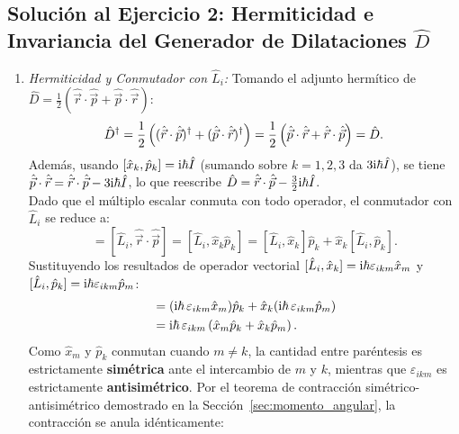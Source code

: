 \begin{appendices}
\subsection[Solución 2: Generador de dilataciones $\hat{D}$]{Solución al Ejercicio 2: Hermiticidad e Invariancia del Generador de Dilataciones $\hat{D}$}
\begin{enumerate}
    \item \textit{Hermiticidad y Conmutador con $\hat{L}_i$:} Tomando el adjunto hermítico de $\hat{D} = \frac{1}{2}(\hat{\vec{r}}\cdot\hat{\vec{p}} + \hat{\vec{p}}\cdot\hat{\vec{r}})$:
    \begin{equation}
        \hat{D}^\dagger = \frac{1}{2}\left( (\hat{\vec{r}}\cdot\hat{\vec{p}})^\dagger + (\hat{\vec{p}}\cdot\hat{\vec{r}})^\dagger \right) = \frac{1}{2}\left( \hat{\vec{p}}\cdot\hat{\vec{r}} + \hat{\vec{r}}\cdot\hat{\vec{p}} \right) = \hat{D}.
    \end{equation}
    Además, usando $[\hat{x}_k, \hat{p}_k] = \mathrm{i}\hbar\hat{I}$ (sumando sobre $k=1,2,3$ da $3\mathrm{i}\hbar\hat{I}$), se tiene $\hat{\vec{p}}\cdot\hat{\vec{r}} = \hat{\vec{r}}\cdot\hat{\vec{p}} - 3\mathrm{i}\hbar\hat{I}$, lo que reescribe $\hat{D} = \hat{\vec{r}}\cdot\hat{\vec{p}} - \frac{3}{2}\mathrm{i}\hbar\hat{I}$.\\
    Dado que el múltiplo escalar conmuta con todo operador, el conmutador con $\hat{L}_i$ se reduce a:
    \begin{equation}
        [\hat{L}_i, \hat{D}] = [\hat{L}_i, \hat{\vec{r}}\cdot\hat{\vec{p}}] = [\hat{L}_i, \hat{x}_k\hat{p}_k] = [\hat{L}_i, \hat{x}_k]\hat{p}_k + \hat{x}_k[\hat{L}_i, \hat{p}_k].
    \end{equation}
    Sustituyendo los resultados de operador vectorial $[\hat{L}_i, \hat{x}_k] = \mathrm{i}\hbar\varepsilon_{ikm}\hat{x}_m$ y $[\hat{L}_i, \hat{p}_k] = \mathrm{i}\hbar\varepsilon_{ikm}\hat{p}_m$:
    \begin{align}
        [\hat{L}_i, \hat{D}] &= (\iu\hbar\,\varepsilon_{ikm}\hat{x}_m)\hat{p}_k + \hat{x}_k(\iu\hbar\,\varepsilon_{ikm}\hat{p}_m) \nonumber\\
        &= \iu\hbar\,\varepsilon_{ikm}\left( \hat{x}_m\hat{p}_k + \hat{x}_k\hat{p}_m \right).
    \end{align}
    Como $\hat{x}_m$ y $\hat{p}_k$ conmutan cuando $m \neq k$, la cantidad entre paréntesis es estrictamente \textbf{simétrica} ante el intercambio de $m$ y $k$, mientras que $\varepsilon_{ikm}$ es estrictamente \textbf{antisimétrico}. Por el teorema de contracción simétrico-antisimétrico demostrado en la Sección~\ref{sec:momento_angular}, la contracción se anula idénticamente:

\end{enumerate}
\end{appendices}
